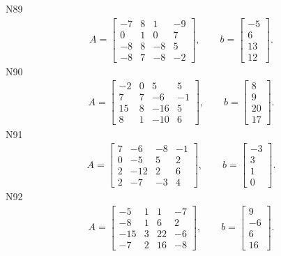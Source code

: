 \documentclass[11pt]{report}
\begin{document}
N89
\begin{align*}
 A = \left[\begin{matrix}-7 & 8 & 1 & -9\\0 & 1 & 0 & 7\\-8 & 8 & -8 & 5\\-8 & 7 & -8 & -2\end{matrix}\right],
\qquad b = \left[\begin{matrix}-5\\6\\13\\12\end{matrix}\right]. 
 \end{align*}
N90
\begin{align*}
 A = \left[\begin{matrix}-2 & 0 & 5 & 5\\7 & 7 & -6 & -1\\15 & 8 & -16 & 5\\8 & 1 & -10 & 6\end{matrix}\right],
\qquad b = \left[\begin{matrix}8\\9\\20\\17\end{matrix}\right]. 
 \end{align*}
N91
\begin{align*}
 A = \left[\begin{matrix}7 & -6 & -8 & -1\\0 & -5 & 5 & 2\\2 & -12 & 2 & 6\\2 & -7 & -3 & 4\end{matrix}\right],
\qquad b = \left[\begin{matrix}-3\\3\\1\\0\end{matrix}\right]. 
 \end{align*}
N92
\begin{align*}
 A = \left[\begin{matrix}-5 & 1 & 1 & -7\\-8 & 1 & 6 & 2\\-15 & 3 & 22 & -6\\-7 & 2 & 16 & -8\end{matrix}\right],
\qquad b = \left[\begin{matrix}9\\-6\\6\\16\end{matrix}\right]. 
 \end{align*}
\end{document}

